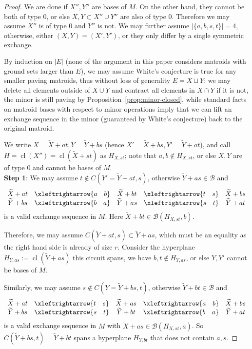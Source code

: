 \documentclass{amsart}
\newcommand{\swap}[2]{\xleftrightarrow{#1 \quad #2}}
\newcommand\Bcal{{\mathcal B}}
\DeclareMathOperator{\cl}{cl}
\begin{document}
\begin{proof}
    We are done if $X'',Y''$ are bases of $M$. On the other hand, they cannot be both of type 0, or else $X,Y\subset X''\cup Y''$ are also of type 0. Therefore we may assume $X''$ is of type 0 and $Y''$ is not. We may further assume $|\{a,b,s,t\}|=4$, otherwise, either $(X,Y)=(X',Y')$, or they only differ by a single symmetric exchange.
    
    By induction on $|E|$ (none of the argument in this paper considers matroids with ground sets larger than $E$), we may assume White's conjecture is true for any smaller paving matroids, thus without loss of generality $E=X\sqcup Y$: we may delete all elements outside of $X\cup Y$ and contract all elements in $X\cap Y$ if it is not, the minor is still paving by Proposition~\ref{prop:minor-closed}, while standard facts on matroid bases with respect to minor operations imply that we can lift an exchange sequence in the minor (guaranteed by White's conjecture) back to the original matroid.

    We write $X=\widetilde{X}+at, Y=\widetilde{Y}+bs$ (hence $X'=\widetilde{X}+bs,Y'=\widetilde{Y}+at$), and call $H=\cl(X'')=\cl(\tilde{X}+st)$ as $H_{X,st}$; note that $a,b\not\in H_{X,st}$, or else $X,Y$ are of type 0 and cannot be bases of $M$.\\
    
    {\bf Step 1}: We may assume $t\not\in C(Y'=\widetilde{Y}+at,s)$, otherwise $\widetilde{Y}+as\in\Bcal$ and
    $$
    \begin{array}{c c c c c}
        \widetilde{X}+at   & \swap{a}{b} & \widetilde{X}+bt & \swap{t}{s} & \widetilde{X}+bs\\
        \widetilde{Y}+bs   & \swap{b}{a} & \widetilde{Y}+as & \swap{s}{t} & \widetilde{Y}+at
    \end{array}
    $$
    is a valid exchange sequence in $M$. Here $\widetilde{X}+bt\in\Bcal(H_{X,st}, b)$.

    Therefore, we may assume $C(\widetilde{Y}+at,s)\subset\widetilde{Y}+as$, which must be an equality as the right hand side is already of size $r$. Consider the hyperplane $H_{Y,as}:=\cl(\widetilde{Y}+as)$ this circuit spans, we have $b,t\not\in H_{Y,as}$, or else $Y,Y'$ cannot be bases of $M$.
    
    Similarly, we may assume $s\not\in C(Y=\widetilde{Y}+bs,t)$, otherwise $\widetilde{Y}+bt\in\Bcal$ and
    $$
    \begin{array}{c c c c c}
        \widetilde{X}+at   & \swap{t}{s} & \widetilde{X}+as & \swap{a}{b} & \widetilde{X}+bs\\
        \widetilde{Y}+bs   & \swap{s}{t} & \widetilde{Y}+bt & \swap{b}{a} & \widetilde{Y}+at
    \end{array}
    $$
    is a valid exchange sequence in $M$ with $\widetilde{X}+as\in\Bcal(H_{X,st}, a)$. So $C(\widetilde{Y}+bs,t)=\widetilde{Y}+bt$ spans a hyperplane $H_{Y,bt}$ that does not contain $a,s$.


\end{proof}
\end{document}
